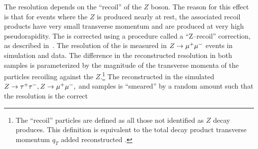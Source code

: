The \MET resolution depends on the ``recoil'' of the
$Z$ boson.  The reason for this effect is that for events where the $Z$ is
produced nearly at rest, the associated recoil products have very small
transverse momentum and are produced at very high pseudorapidity.  The \MET is
corrected using a procedure called a ``Z--recoil'' correction, as described
in~\cite{CMS_AN_2010-332}.  The resolution of the \MET is measured in $Z\to\mu^+\mu^-$
events in simulation and data.  The difference in the reconstructed \MET
resolution in both samples is parameterized by the magnitude of the transverse
momenta of the particles recoiling against the $Z$.\footnote{The ``recoil''
particles are defined as all those not identified as $Z$ decay produces. This
definition is equivalent to the total decay product transverse momentum $q_T$
added reconstructed \MET.}  The
reconstructed \MET in the simulated $Z\to\tau^+\tau^-, Z\to\mu^+\mu^-,$ and \WpJets samples is
``smeared'' by a random amount such that the resolution is the correct 

